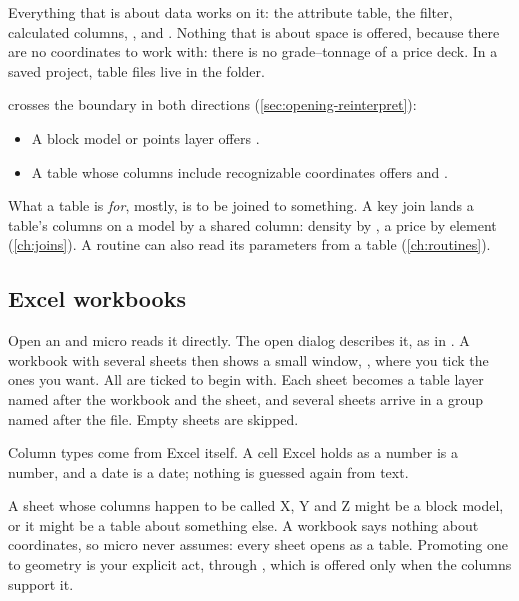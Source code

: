 Everything that is about data works on it: the attribute table, the filter, calculated columns, , and . Nothing that is about space is offered, because there are no coordinates to work with: there is no grade–tonnage of a price deck. In a saved project, table files live in the  folder.

 crosses the boundary in both directions (\cref{sec:opening-reinterpret}):

\begin{itemize}
\item A block model or points layer offers .
\item A table whose columns include recognizable coordinates offers  and .
\end{itemize}

What a table is \emph{for}, mostly, is to be joined to something. A key join lands a table's columns on a model by a shared column: density by , a price by element (\cref{ch:joins}). A routine can also read its parameters from a table (\cref{ch:routines}).

\subsection{Excel workbooks}\label{sec:columns-xlsx}

Open an  and micro reads it directly. The open dialog describes it, as in . A workbook with several sheets then shows a small window, , where you tick the ones you want. All are ticked to begin with. Each sheet becomes a table layer named after the workbook and the sheet, and several sheets arrive in a group named after the file. Empty sheets are skipped.

Column types come from Excel itself. A cell Excel holds as a number is a number, and a date is a date; nothing is guessed again from text.

\begin{why}
A sheet whose columns happen to be called X, Y and Z might be a block model, or it might be a table about something else. A workbook says nothing about coordinates, so micro never assumes: every sheet opens as a table. Promoting one to geometry is your explicit act, through , which is offered only when the columns support it.
\end{why}

